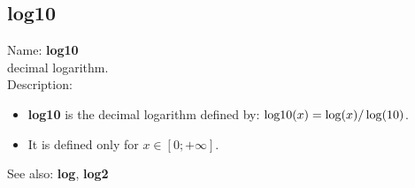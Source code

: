 \subsection{ log10 }
\noindent Name: \textbf{log10}\\
decimal logarithm.\\

\noindent Description: \begin{itemize}

\item \textbf{log10} is the decimal logarithm defined by: ${\rm log10}(x) = \log(x)/\log(10)$.

\item It is defined only for $x \in [0; +\infty]$.
\end{itemize}
See also: \textbf{log}, \textbf{log2}
